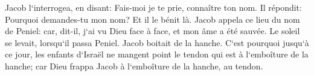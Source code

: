 \verse Jacob l`interrogea, en disant: Fais-moi je te prie, connaître ton nom. Il répondit: Pourquoi demandes-tu mon nom? Et il le bénit là. 
\verse Jacob appela ce lieu du nom de Peniel: car, dit-il, j`ai vu Dieu face à face, et mon âme a été sauvée. 
\verse Le soleil se levait, lorsqu`il passa Peniel. Jacob boitait de la hanche. 
\verse C`est pourquoi jusqu`à ce jour, les enfants d`Israël ne mangent point le tendon qui est à l`emboîture de la hanche; car Dieu frappa Jacob à l`emboîture de la hanche, au tendon. 

\chapter{}

